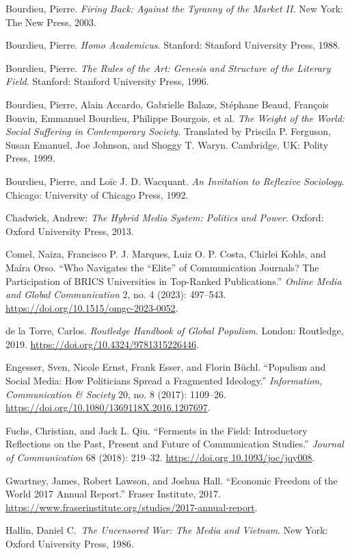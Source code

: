 \documentclass{tufte-handout}
\begin{document}
{{{{\begin{hangparas}{.25in}{1}
Bourdieu, Pierre. \emph{Firing Back: Against the Tyranny of the Market
II.} New York: The New Press, 2003.

Bourdieu, Pierre. \emph{Homo Academicus}. Stanford: Stanford University
Press, 1988.

Bourdieu, Pierre. \emph{The Rules of the Art: Genesis and Structure of
the Literary Field}. Stanford: Stanford University Press, 1996.

Bourdieu, Pierre, Alain Accardo, Gabrielle Balazs, Stéphane Beaud,
François Bonvin, Emmanuel Bourdieu, Philippe Bourgois, et al. \emph{The
Weight of the World: Social Suffering in Contemporary Society.}
Translated by Priscila P. Ferguson, Susan Emanuel, Joe Johnson, and
Shoggy T. Waryn. Cambridge, UK: Polity Press, 1999.

Bourdieu, Pierre, and Loïc J. D. Wacquant. \emph{An Invitation to
Reflexive Sociology}. Chicago: University of Chicago Press, 1992.

Chadwick, Andrew: \emph{The Hybrid Media System: Politics and Power.}
Oxford: Oxford University Press, 2013.

Comel, Naiza, Francisco P. J. Marques, Luiz O. P. Costa, Chirlei Kohls,
and Maíra Orso. ``Who Navigates the ``Elite'' of Communication Journals?
The Participation of BRICS Universities in Top-Ranked Publications.''
\emph{Online Media and Global Communication} 2, no. 4 (2023): 497--543.
\url{https://doi.org/10.1515/omgc-2023-0052}.

de la Torre, Carlos. \emph{Routledge Handbook of Global Populism}.
London: Routledge, 2019. \url{https://doi.org/10.4324/9781315226446}.

Engesser, Sven, Nicole Ernst, Frank Esser, and Florin Büchl. ``Populism
and Social Media: How Politicians Spread a Fragmented Ideology.''
\emph{Information, Communication \& Society} 20, no. 8 (2017): 1109--26.
\url{https://doi.org/10.1080/1369118X.2016.1207697}.

Fuchs, Christian, and Jack L. Qiu. ``Ferments in the Field: Introductory
Reflections on the Past, Present and Future of Communication Studies.''
\emph{Journal of Communication} 68 (2018): 219--32.
\href{https://doi.org\%2010.1093/joc/jqy008}{https://doi.org
10.1093/joc/jqy008}.

Gwartney, James, Robert Lawson, and Joshua Hall. ``Economic Freedom of
the World 2017 Annual Report.'' Fraser Institute, 2017.
\url{https://www.fraserinstitute.org/studies/2017-annual-report}.

Hallin, Daniel C.~\emph{The Uncensored War: The Media and Vietnam}. New
York: Oxford University Press, 1986.


\end{hangparas}}}}}
\end{document}

